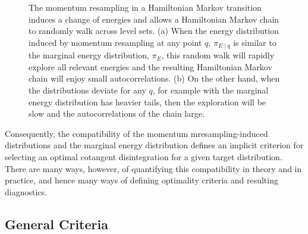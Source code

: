 \documentclass[stslayout]{imsart}
\begin{document}
\begin{figure}
\centering
{}
\caption{The momentum resampling in a Hamiltonian Markov transition
induces a change of energies and allows a Hamiltonian Markov chain to 
randomly walk across level sets.  (a) When the energy distribution induced
by momentum resampling at any point $q$, $\pi_{E \mid q}$ is similar to the 
marginal energy distribution, $\pi_{E}$, this random walk will rapidly explore 
all relevant energies and the resulting Hamiltonian Markov chain will enjoy
small autocorrelations.  (b) On the other hand, when the distributions
deviate for any $q$, for example with the marginal energy distribution has 
heavier tails, then the exploration will be slow and the autocorrelations of 
the chain large.}
\label{fig:energy_marginals}
\end{figure}

Consequently, the compatibility of the momentum mresampling-induced 
distributions and the marginal energy distribution defines an implicit criterion 
for selecting an optimal cotangent disintegration for a given target distribution.  
There are many ways, however, of quantifying this compatibility in theory and 
in practice, and hence many ways of defining optimality criteria and resulting
diagnostics.

\subsection{General Criteria}
\end{document}
